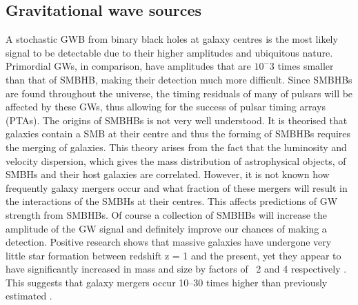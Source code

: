 \documentclass[12pt]{article}
\begin{document}
	\subsection{Gravitational wave sources}

	
A stochastic GWB from binary black holes at galaxy centres is the most likely signal to be detectable due to their higher amplitudes and ubiquitous nature. Primordial GWs, in comparison, have amplitudes that are $10^-3$ times smaller than that of SMBHB, making their detection much more difficult. Since SMBHBs are found throughout the universe, the timing residuals of many of pulsars will be affected by these GWs, thus allowing for the success of pulsar timing arrays (PTAs). The origins of SMBHBs is not very well understood. It is theorised that galaxies contain a SMB at their centre and thus the forming of SMBHBs requires the merging of galaxies. This theory arises from the fact that the luminosity and velocity dispersion, which gives the mass distribution of astrophysical objects, of SMBHs and their host galaxies are correlated. However, it is not known how frequently galaxy mergers occur and what fraction of these mergers will result in the interactions of the SMBHs at their centres. This affects predictions of GW strength from SMBHBs. Of course a collection of SMBHBs will increase the amplitude of the GW signal and definitely improve our chances of making a detection. Positive research shows that massive galaxies have undergone very little star formation between redshift z = 1 and the present, yet they appear to have significantly increased in mass and size by factors of ~2 and 4 respectively \cite{van2012stellar}. This suggests that galaxy mergers occur 10–30 times higher than previously estimated \cite{mcwilliams2012imminent}.	
\end{document}
